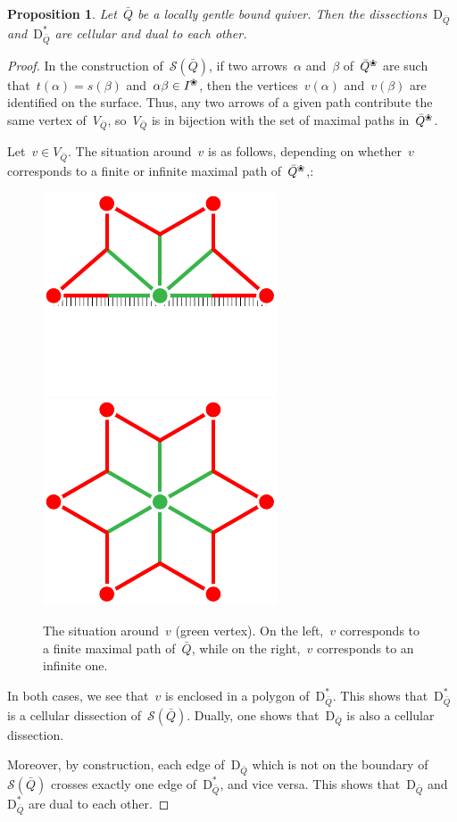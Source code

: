 \documentclass{amsart}
\newtheorem{proposition}[theorem]{Proposition}
\theoremstyle{definition}
\newcommand{\blossom}{^\text{\ding{96}}} %
\newcommand{\surface}{\mathcal{S}} %
\newcommand{\dual}{^*} %
\newcommand{\dissection}{\mathrm{D}} %
\begin{document}
\begin{proposition}
\label{prop:dissectionsAreCellular}
Let~$\bar Q$ be a locally gentle bound quiver.
Then the dissections~$\dissection_{\bar Q}$ and~$\dissection_{\bar Q}\dual$ are cellular and dual to each other.
\end{proposition}
\begin{proof}
In the construction of~$\surface(\bar Q)$, if two arrows~$\alpha$ and~$\beta$ of~$\bar Q \blossom$ are such that~$t(\alpha) = s(\beta)$ and~$\alpha\beta\in I\blossom$, then the vertices~$v(\alpha)$ and~$v(\beta)$ are identified on the surface.
Thus, any two arrows of a given path contribute the same vertex of~$V_{\bar Q}$, so~$V_{\bar Q}$ is in bijection with the set of maximal paths in~$\bar Q\blossom$.

Let~$v\in V_{\bar Q}$. The situation around~$v$ is as follows, depending on whether~$v$ corresponds to a finite or infinite maximal path of~$\bar Q\blossom$,:

\begin{figure}[h]
	\capstart
	\centerline{\includegraphics[scale=.7]{halfStar} \qquad \includegraphics[scale=.7]{star}}
	\caption{The situation around~$v$ (green vertex). On the left,~$v$ corresponds to a finite maximal path of~$\bar Q$, while on the right,~$v$ corresponds to an infinite one.}
	\label{fig:stars}
\end{figure}

In both cases, we see that~$v$ is enclosed in a polygon of~$\dissection_{\bar Q}\dual$.  This shows that~$\dissection_{\bar Q}\dual$ is a cellular dissection of~$\surface(\bar Q)$.
Dually, one shows that~$\dissection_{\bar Q}$ is also a cellular dissection.

Moreover, by construction, each edge of~$\dissection_{\bar Q}$ which is not on the boundary of~$\surface(\bar Q)$ crosses exactly one edge of~$\dissection_{\bar Q}\dual$, and vice versa.
This shows that~$\dissection_{\bar Q}$ and~$\dissection_{\bar Q}\dual$ are dual to each other.
\end{proof}
\end{document}
